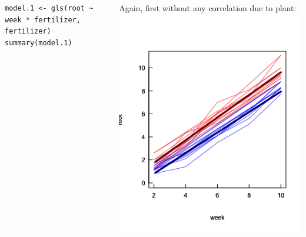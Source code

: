 \documentclass{beamer}
\begin{document}
\begin{frame}[fragile]{}
\begin{columns}
    \small
    \begin{column}{0.7\textwidth}
      \begin{verbatim}
model.1 <- gls(root ~ week * fertilizer, fertilizer)
summary(model.1)
      \end{verbatim}
    \tiny\scalebox{0.9}{
    
  } 
    \end{column}
    \begin{column}{0.3\textwidth}
    Again, first without any correlation due to plant:
    \includegraphics[width=\textwidth]{lectures/day_4_GLS/figures/unnamed-chunk-32-1.png}    
    \end{column}
\end{columns}
\end{frame}
\end{document}
